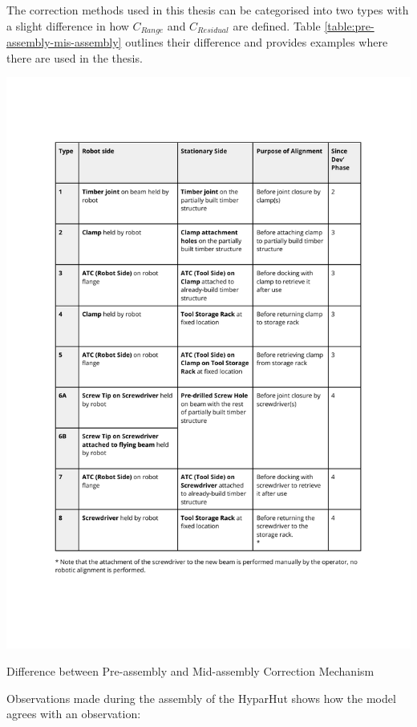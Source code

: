 \FloatBarrier

The correction methods used in this thesis can be categorised into two types with a slight difference in how $C_{Range}$ and $C_{Residual}$ are defined. Table \ref{table:pre-assembly-mis-assembly} outlines their difference and provides examples where there are used in the thesis.

\begin{table}[h]
    \includegraphics[page=6, trim=25.4mm 160mm 25.4mm 33mm, clip, width=\textwidth]{tables/Tables in Chapter 9 to 11.pdf}
    \caption{Difference between Pre-assembly and Mid-assembly Correction Mechanism}
    \label{table:pre-assembly-mis-assembly}
\end{table}

Observations made during the assembly of the HyparHut shows how the model agrees with an observation:

